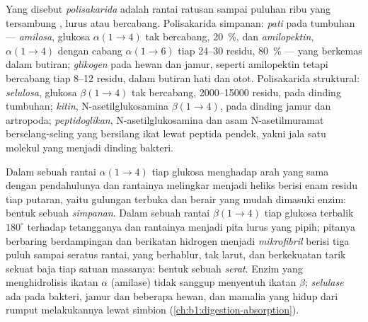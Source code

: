 \begin{definition}[Polisakarida]\label{def:b1:carbohydrates:polysaccharide}
Yang disebut \emph{polisakarida} adalah rantai
ratusan sampai puluhan ribu  yang tersambung , lurus atau bercabang. Polisakarida simpanan:
\emph{pati} pada tumbuhan --- \emph{amilosa}, glukosa
$\alpha(1{\to}4)$ tak bercabang, \qty{20}{\%}, dan
\emph{amilopektin}, $\alpha(1{\to}4)$ dengan cabang $\alpha(1{\to}6)$
tiap \qtyrange{24}{30}{} residu, \qty{80}{\%} --- yang berkemas dalam
butiran; \emph{glikogen} pada hewan dan jamur, seperti
amilopektin tetapi bercabang tiap \qtyrange{8}{12}{} residu, dalam
butiran  hati dan otot. Polisakarida struktural:
\emph{selulosa}, glukosa $\beta(1{\to}4)$ tak
bercabang, \qtyrange{2000}{15000}{} residu, pada dinding tumbuhan;
\emph{kitin}, N-asetilglukosamina $\beta(1{\to}4)$, pada
dinding jamur dan  artropoda;
\emph{peptidoglikan}, N-asetilglukosamina dan asam
N-asetilmuramat berselang-seling yang bersilang ikat lewat peptida
pendek, yakni jala satu molekul yang menjadi dinding bakteri.
\end{definition}

\begin{proposition}\label{prop:b1:carbohydrates:alphabeta}
Dalam sebuah rantai $\alpha(1{\to}4)$ tiap glukosa menghadap arah yang
sama dengan pendahulunya dan rantainya melingkar menjadi heliks berisi
enam residu tiap putaran, yaitu gulungan terbuka dan berair yang mudah
dimasuki enzim: bentuk sebuah \emph{simpanan}. Dalam sebuah rantai
$\beta(1{\to}4)$ tiap glukosa terbalik $180^\circ$ terhadap tetangganya
dan rantainya menjadi pita lurus yang pipih; pitanya berbaring
berdampingan dan berikatan hidrogen menjadi
\emph{mikrofibril} berisi tiga puluh sampai seratus rantai, yang
berhablur, tak larut, dan berkekuatan tarik sekuat baja tiap satuan
massanya: bentuk sebuah \emph{serat}. Enzim yang menghidrolisis ikatan
$\alpha$ (amilase) tidak sanggup menyentuh ikatan $\beta$;
\emph{selulase} ada pada bakteri, jamur dan beberapa hewan, dan mamalia
yang hidup dari rumput melakukannya lewat simbion
(\cref{ch:b1:digestion-absorption}).
\end{proposition}

